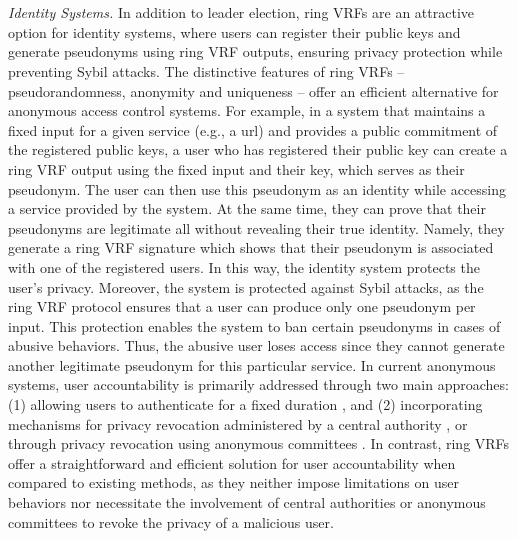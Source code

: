 \\\\
\emph{Identity Systems.} In addition to leader election, ring VRFs are an attractive option for identity systems, where users can register their public keys and generate pseudonyms using ring VRF outputs, ensuring privacy protection while preventing Sybil attacks.  The distinctive features of ring VRFs -- pseudorandomness, anonymity and uniqueness -- offer an efficient alternative for anonymous access control systems. For example, in a system that maintains a fixed input for a given service (e.g., a url) and provides a public commitment of the registered public keys, a user who has registered their public key can create a ring VRF output using the fixed input and their key, which serves as their pseudonym.  The user can then use this pseudonym as an identity while accessing a service provided by the system. At the same time, they can prove that their pseudonyms  are  legitimate  all without revealing their true identity. Namely, they generate a ring VRF signature which shows that their pseudonym is associated with one of the registered users. In this way, the identity system protects the user's  privacy. Moreover, the  system is protected against Sybil attacks, as the ring VRF protocol ensures that a user can produce only one pseudonym per input. 
This protection enables the system to ban certain pseudonyms in cases of abusive behaviors. Thus, the abusive user loses access since they cannot generate  another legitimate pseudonym for this particular service.
In current anonymous systems, user accountability is primarily addressed through two main approaches: (1) allowing users to authenticate for a fixed duration \cite{limited_authentication1,limited_authentication2,limited_authentication3}, and (2) incorporating mechanisms for privacy revocation administered by a central authority \cite{revocation1,revocation2,revocation3,revocation4}, or through privacy revocation using anonymous committees \cite{anonymous-committee1,anonymous-committee2}.
In contrast, ring VRFs offer a straightforward and efficient solution for user accountability when compared to existing methods, as they neither impose limitations on user behaviors  nor necessitate the involvement of central authorities or anonymous committees to revoke the privacy of a malicious user.
